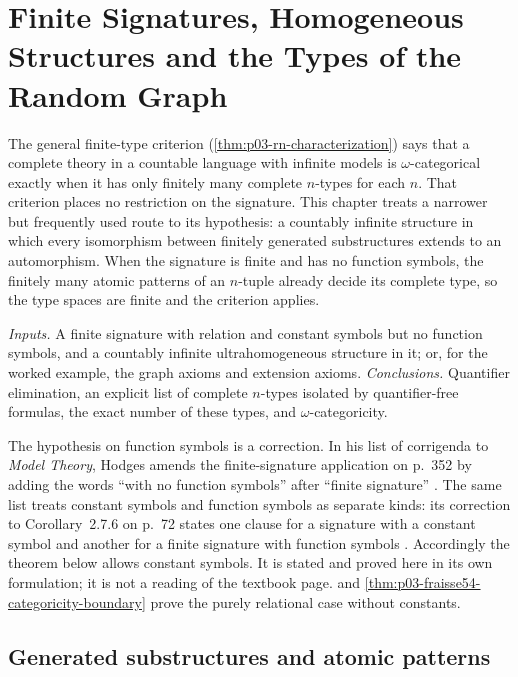 \chapter{Finite Signatures, Homogeneous Structures and the Types of the Random Graph}
\label{sec:p03-w03-p03-015-finite-signature}

The general finite-type criterion
(\cref{thm:p03-rn-characterization}) says that a complete theory in a
countable language with infinite models is \(\omega\)-categorical exactly
when it has only finitely many complete \(n\)-types for each \(n\).
That criterion places no restriction on the signature. This chapter
treats a narrower but frequently used route to its hypothesis: a
countably infinite structure in which every isomorphism between finitely
generated substructures extends to an automorphism. When the signature is
finite and has no function symbols, the finitely many atomic patterns of
an \(n\)-tuple already decide its complete type, so the type spaces are
finite and the criterion applies.

\emph{Inputs.} A finite signature with relation and constant symbols but
no function symbols, and a countably infinite ultrahomogeneous structure
in it; or, for the worked example, the graph axioms and extension axioms.
\emph{Conclusions.} Quantifier elimination, an explicit list of complete
\(n\)-types isolated by quantifier-free formulas, the exact number of
these types, and \(\omega\)-categoricity.

The hypothesis on function symbols is a correction. In his list of
corrigenda to \emph{Model Theory}, Hodges amends the finite-signature
application on p.~352 by adding the words ``with no function symbols''
after ``finite signature'' \cite[p.~3]{Hodges1993Corrigenda2011}. The same
list treats constant symbols and function symbols as separate kinds: its
correction to Corollary~2.7.6 on p.~72 states one clause for a signature
with a constant symbol and another for a finite signature with function
symbols \cite[p.~1]{Hodges1993Corrigenda2011}. Accordingly the theorem
below allows constant symbols. It is stated and proved here in its own
formulation; it is not a reading of the textbook page.
 and
\cref{thm:p03-fraisse54-categoricity-boundary} prove the purely relational
case without constants.

\section{Generated substructures and atomic patterns}
\label{sec:p03-w03-p03-015-setting}

